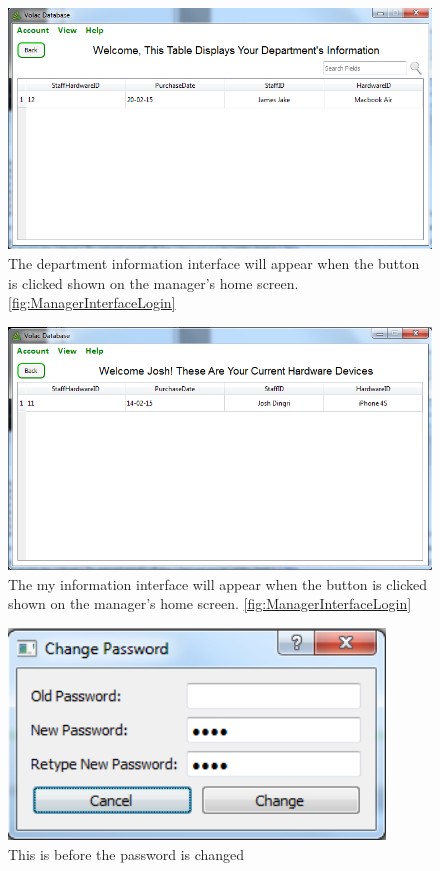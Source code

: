 \begin{figure}[H]
    \includegraphics[width=\textwidth]{./Testing/Images/DepartmentInformation.png}
    \caption{The department information interface will appear when the button is clicked shown on the manager's home screen. \ref{fig:ManagerInterfaceLogin} } \label{fig:DepartmentInformation}
\end{figure}

\begin{figure}[H]
    \includegraphics[width=\textwidth]{./Testing/Images/MyInformation.png}
    \caption{The my information interface will appear when the button is clicked shown on the manager's home screen. \ref{fig:ManagerInterfaceLogin} } \label{fig:MyInformation}
\end{figure}

\begin{figure}[H]
    \includegraphics[width=100mm,scale=1]{./Testing/Images/ChangePasswordWindow.png}
    \caption{This is before the password is changed} \label{fig:ChangePasswordWindow}
\end{figure}

